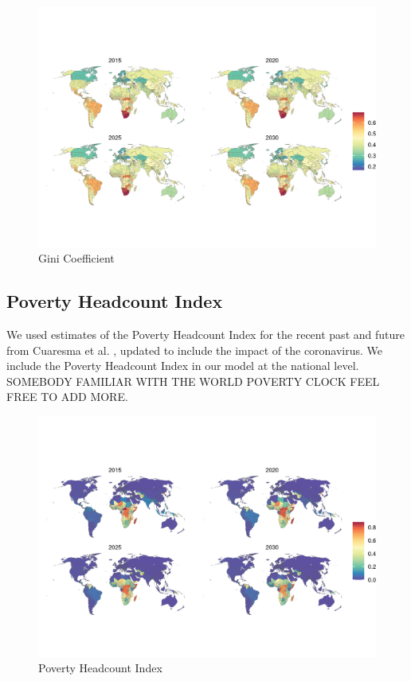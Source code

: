 \documentclass{article}
\begin{document}
\begin{figure}[H]
  \centering
  \includegraphics[width=\linewidth]{img/covars/gini.png}
  \caption{Gini Coefficient}
\end{figure}

\subsection{Poverty Headcount Index}
We used estimates of the Poverty Headcount Index for the recent past and future from Cuaresma et al. \citep{Cuaresma2018}, updated to include the impact of the coronavirus.  We include the Poverty Headcount Index in our model at the national level.  SOMEBODY FAMILIAR WITH THE WORLD POVERTY CLOCK FEEL FREE TO ADD MORE.

\begin{figure}[H]
  \centering
  \includegraphics[width=\linewidth]{img/covars/hci.png}
  \caption{Poverty Headcount Index}
\end{figure}
\end{document}

